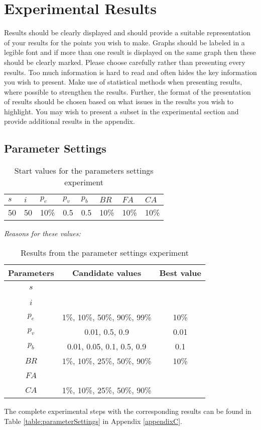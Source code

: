 \section{Experimental Results}

Results should be clearly displayed and should provide a suitable representation of your results for the points you wish to make. Graphs should be labeled in a legible font and if more than one result is displayed on the same graph then these should be clearly marked.   Please choose carefully rather than presenting every results. Too much information is hard to read and often hides the key information you wish to present. Make use of statistical methods when presenting results, where possible to strengthen the results.  Further, the format of the presentation of results should be chosen based on what issues in the results you wish to highlight. You may wish to present a subset in the experimental section and provide additional results in the appendix.

\subsection{Parameter Settings}
\label{subsec:parameterSettings_results}

\begin{table}[H]
	\centering
    \begin{tabular}{|l|l|l|l|l|l|l|l|}
 	\hline
 	$s$ & $i$ & $p_{e}$ & $p_{v}$ & $p_{b}$ & $BR$  & $FA$ & $CA$  \\
 	\hline
    50 & 50 & 10\% & 0.5 & 0.5 & 10\% & 10\%  & 10\%  \\
	\hline
    \end{tabular}
    \caption {Start values for the parameters settings experiment} \emph{\color{red} Reasons for these values:}
    \label{table:parameter_startvalues}
	\end{table}

	\begin{table}[H]
	\centering
    \begin{tabular}{|c|c||c|}
 	\hline
 	Parameters & Candidate values & Best value\\
 	\hline
    $s$ & ~ & ~ \\
    $i$ & ~ & ~ \\
    $p_{e}$ & 1\%, 10\%, 50\%, 90\%, 99\% & 10\% \\
    $p_{v}$ & 0.01, 0.5, 0.9 & 0.01  \\
    $p_{b}$ & 0.01, 0.05, 0.1, 0.5, 0.9 & 0.1 \\
    $BR$ & 1\%, 10\%, 25\%, 50\%, 90\% & 10\% \\
    $FA$ & ~ & ~ \\
    $CA$ & 1\%, 10\%, 25\%, 50\%, 90\% & ~ \\
	\hline
    \end{tabular}
    \caption {Results from the parameter settings experiment}
    The complete experimental steps with the corresponding results can be found in Table \ref{table:parameterSettings} in Appendix \ref{appendixC}.
    \label{table:parameterSettings2}
	\end{table}

